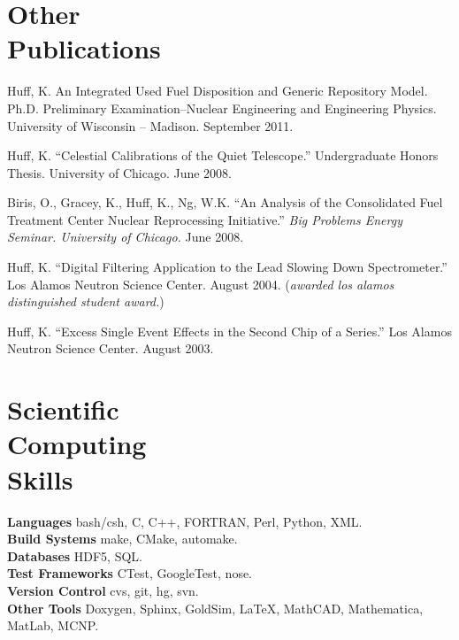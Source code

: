 \documentclass[margin,line]{resume}
\begin{document}
\begin{resume}
    \section{\mysidestyle Other\\Publications}
    \begin{bibenum}
      \item Huff, K. An Integrated Used Fuel Disposition and Generic Repository Model. 
        Ph.D. Preliminary Examination--Nuclear Engineering and Engineering 
        Physics. University of Wisconsin -- Madison.  September 2011. 
      \item Huff, K. ``Celestial Calibrations of the Quiet Telescope.''
        Undergraduate Honors Thesis. University of Chicago. June 2008.
      \item Biris, O., Gracey, K., Huff, K., Ng, W.K.  
        ``An Analysis of the Consolidated Fuel Treatment Center Nuclear 
        Reprocessing Initiative.''
        \emph{Big Problems Energy Seminar. University of Chicago.} June 2008.
    \pagebreak
      \item Huff, K. ``Digital Filtering Application to the Lead Slowing Down 
        Spectrometer.'' Los Alamos Neutron Science Center. August 2004.  %
        (\emph{awarded los alamos distinguished student award.}) 
      \item Huff, K. ``Excess Single Event Effects in the Second Chip of a Series.'' 
        Los Alamos Neutron Science Center. August 2003. 
    \end{bibenum}

    \section{\mysidestyle Scientific\\Computing\\Skills} 
                \textbf{Languages} \hfill bash/csh, C, C++, FORTRAN, Perl, Python, XML.\vspace{.5mm}\\%
                \textbf{Build Systems} \hfill make, CMake, automake.\vspace{.5mm}\\%
                \textbf{Databases} \hfill HDF5, SQL.\vspace{.5mm}\\%
                \textbf{Test Frameworks} \hfill CTest, GoogleTest, nose.\vspace{.5mm}\\%
                \textbf{Version Control} \hfill cvs, git, hg, svn.\vspace{.5mm}\\%
                \textbf{Other Tools} \hfill Doxygen, Sphinx, GoldSim, \LaTeX, MathCAD, Mathematica, MatLab, MCNP.\vspace{.5mm}\\%


\end{resume}
\end{document}
